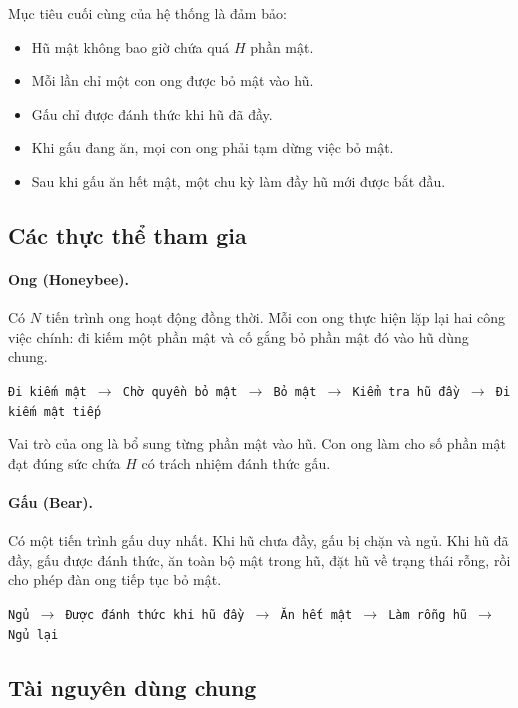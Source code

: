 Mục tiêu cuối cùng của hệ thống là đảm bảo:

\begin{itemize}
\item Hũ mật không bao giờ chứa quá $H$ phần mật.
\item Mỗi lần chỉ một con ong được bỏ mật vào hũ.
\item Gấu chỉ được đánh thức khi hũ đã đầy.
\item Khi gấu đang ăn, mọi con ong phải tạm dừng việc bỏ mật.
\item Sau khi gấu ăn hết mật, một chu kỳ làm đầy hũ mới được bắt đầu.
\end{itemize}

\subsection{Các thực thể tham gia}

\paragraph{Ong (Honeybee).}

Có $N$ tiến trình ong hoạt động đồng thời. Mỗi con ong thực hiện lặp lại
hai công việc chính: đi kiếm một phần mật và cố gắng bỏ phần mật đó vào
hũ dùng chung.

\begin{center}
\texttt{Đi kiếm mật $\rightarrow$ Chờ quyền bỏ mật $\rightarrow$ Bỏ mật
$\rightarrow$ Kiểm tra hũ đầy $\rightarrow$ Đi kiếm mật tiếp}
\end{center}

Vai trò của ong là bổ sung từng phần mật vào hũ. Con ong làm cho số phần
mật đạt đúng sức chứa $H$ có trách nhiệm đánh thức gấu.

\paragraph{Gấu (Bear).}

Có một tiến trình gấu duy nhất. Khi hũ chưa đầy, gấu bị chặn và ngủ.
Khi hũ đã đầy, gấu được đánh thức, ăn toàn bộ mật trong hũ, đặt hũ về
trạng thái rỗng, rồi cho phép đàn ong tiếp tục bỏ mật.

\begin{center}
\texttt{Ngủ $\rightarrow$ Được đánh thức khi hũ đầy $\rightarrow$
Ăn hết mật $\rightarrow$ Làm rỗng hũ $\rightarrow$ Ngủ lại}
\end{center}

\subsection{Tài nguyên dùng chung}

